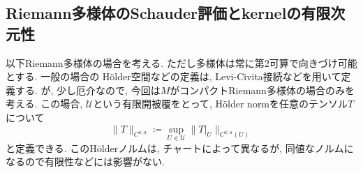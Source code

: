\documentclass[dvipdfmx,a4paper,11pt]{article} %
\theoremstyle{definition}
\newtheorem{defn}[thm]{Definition}
\theoremstyle{remark}
\numberwithin{equation}{section}
\newcommand{\inj}{{\rm inj}}
\begin{document}
\subsection{Riemann多様体のSchauder評価とkernelの有限次元性}
以下Riemann多様体の場合を考える. ただし多様体は常に第2可算で向きづけ可能とする.
一般の場合の H\"older空間などの定義は, Levi-Civita接続などを用いて定義する. 
が, 少し厄介なので, 今回は$M$がコンパクトRiemann多様体の場合のみを考える. 
この場合, $\mathscr{U}$という有限開被覆をとって, H\"older normを任意のテンソル$T$について
\[
\lVert T\rVert_{C^{k,\alpha}}
\coloneqq  \sup_{U \in \mathscr{U}}
\lVert T\vert_{U}\rVert_{C^{k,\alpha}(U)}
\]
と定義できる. このH\"olderノルムは, チャートによって異なるが, 同値なノルムになるので有限性などには影響がない.  

\end{document}
